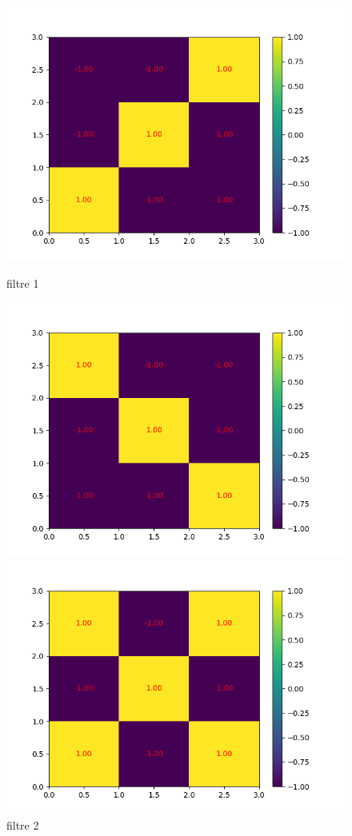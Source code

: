 \begin{figure}[!htb]
        \includegraphics[width=\textwidth]{img/cnn_exemple/square/filtre_1.png}
        \caption{filtre 1}
    \endminipage\hfill
        \includegraphics[width=\textwidth]{img/cnn_exemple/square/filtre_2.png}
        \caption{filtre 2}
    \endminipage\hfill
        \includegraphics[width=\textwidth]{img/cnn_exemple/square/filtre_3.png}

\end{figure}
